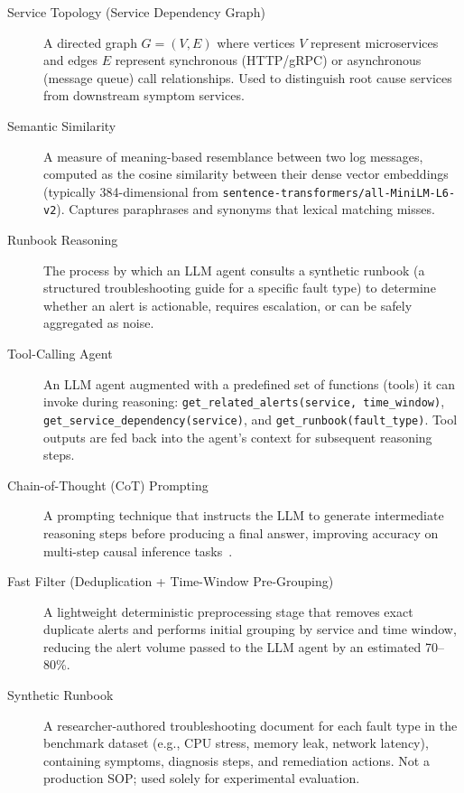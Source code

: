 \begin{description}

\item[Service Topology (Service Dependency Graph)]
A directed graph $G = (V, E)$ where vertices $V$ represent microservices and edges $E$ represent synchronous (HTTP/gRPC) or asynchronous (message queue) call relationships. Used to distinguish root cause services from downstream symptom services.

\item[Semantic Similarity]
A measure of meaning-based resemblance between two log messages, computed as the cosine similarity between their dense vector embeddings (typically 384-dimensional from \texttt{sentence-transformers/all-MiniLM-L6-v2}). Captures paraphrases and synonyms that lexical matching misses.

\item[Runbook Reasoning]
The process by which an LLM agent consults a synthetic runbook (a structured troubleshooting guide for a specific fault type) to determine whether an alert is actionable, requires escalation, or can be safely aggregated as noise.

\item[Tool-Calling Agent]
An LLM agent augmented with a predefined set of functions (tools) it can invoke during reasoning: \texttt{get\_related\_alerts(service, time\_window)}, \texttt{get\_service\_dependency(service)}, and \texttt{get\_runbook(fault\_type)}. Tool outputs are fed back into the agent's context for subsequent reasoning steps.

\item[Chain-of-Thought (CoT) Prompting]
A prompting technique that instructs the LLM to generate intermediate reasoning steps before producing a final answer, improving accuracy on multi-step causal inference tasks~\cite{wei2022cot}.

\item[Fast Filter (Deduplication + Time-Window Pre-Grouping)]
A lightweight deterministic preprocessing stage that removes exact duplicate alerts and performs initial grouping by service and time window, reducing the alert volume passed to the LLM agent by an estimated 70--80\%.

\item[Synthetic Runbook]
A researcher-authored troubleshooting document for each fault type in the benchmark dataset (e.g., CPU stress, memory leak, network latency), containing symptoms, diagnosis steps, and remediation actions. Not a production SOP; used solely for experimental evaluation.


\end{description}
